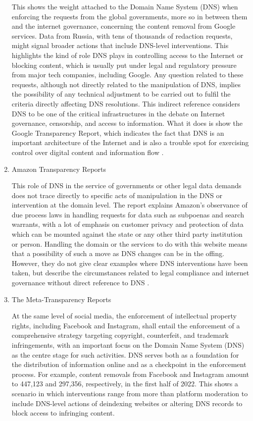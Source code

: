 \begin{enumerate}
This shows the weight attached to the Domain Name System (DNS) when enforcing the requests from the global governments, more so in between them and the internet governance, concerning the content removal from Google services. Data from Russia, with tens of thousands of redaction requests, might signal broader actions that include DNS-level interventions. This highlights the kind of role DNS plays in controlling access to the Internet or blocking content, which is usually put under legal and regulatory pressure from major tech companies, including Google. Any question related to these requests, although not directly related to the manipulation of DNS, implies the possibility of any technical adjustment to be carried out to fulfil the criteria directly affecting DNS resolutions. This indirect reference considers DNS to be one of the critical infrastructures in the debate on Internet governance, censorship, and access to information. What it does is show the Google Transparency Report, which indicates the fact that DNS is an important architecture of the Internet and is also a trouble spot for exercising control over digital content and information flow \cite{Google2023}.

\item Amazon Transparency Reports 

This role of DNS in the service of governments or other legal data demands does not trace directly to specific acts of manipulation in the DNS or intervention at the domain level. The report explains Amazon's observance of due process laws in handling requests for data such as subpoenas and search warrants, with a lot of emphasis on customer privacy and protection of data which can be mounted against the state or any other third party institution or person. Handling the domain or the services to do with this website means that a possibility of such a move as DNS changes can be in the offing. However, they do not give clear examples where DNS interventions have been taken, but describe the circumstances related to legal compliance and internet governance without direct reference to DNS \cite{Amazon2023}.
\vspace{20px}


\item The Meta-Transparency Reports

At the same level of social media, the enforcement of intellectual property rights, including Facebook and Instagram, shall entail the enforcement of a comprehensive strategy targeting copyright, counterfeit, and trademark infringements, with an important focus on the Domain Name System (DNS) as the centre stage for such activities.  DNS serves both as a foundation for the distribution of information online and as a checkpoint in the enforcement process. For example, content removals from Facebook and Instagram amount to 447,123 and 297,356, respectively, in the first half of 2022. This shows a scenario in which interventions range from more than platform moderation to include DNS-level actions of deindexing websites or altering DNS records to block access to infringing content.


\end{enumerate}
